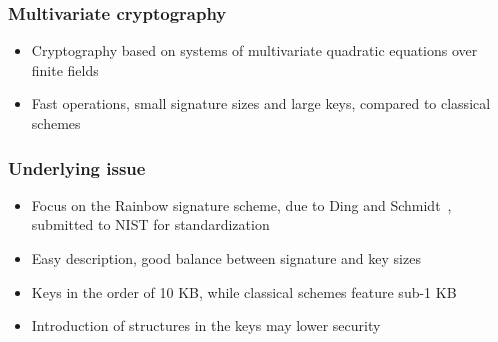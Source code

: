 \documentclass[12pt]{beamer}
\begin{document}
\begin{frame}
  \frametitle{Multivariate cryptography}
  \begin{itemize}
    \item Cryptography based on systems of multivariate quadratic equations
        over finite fields
    \begin{figure}
      \vspace{2mm}
      \centering
    \end{figure}
    \item Fast operations, small signature sizes and large keys, compared to
        classical schemes
  \end{itemize}
\end{frame}

\begin{frame}
  \frametitle{Underlying issue}
  \begin{itemize}
    \item Focus on the Rainbow signature scheme, due to Ding and
        Schmidt~\cite{Ding:inproc:2005:jun}, submitted to NIST for
          standardization
    \item Easy description, good balance between signature and key sizes
    \item Keys in the order of 10 KB, while classical schemes feature sub-1 KB
    \item Introduction of structures in the keys may lower security
  \end{itemize}
\end{frame}
\end{document}

